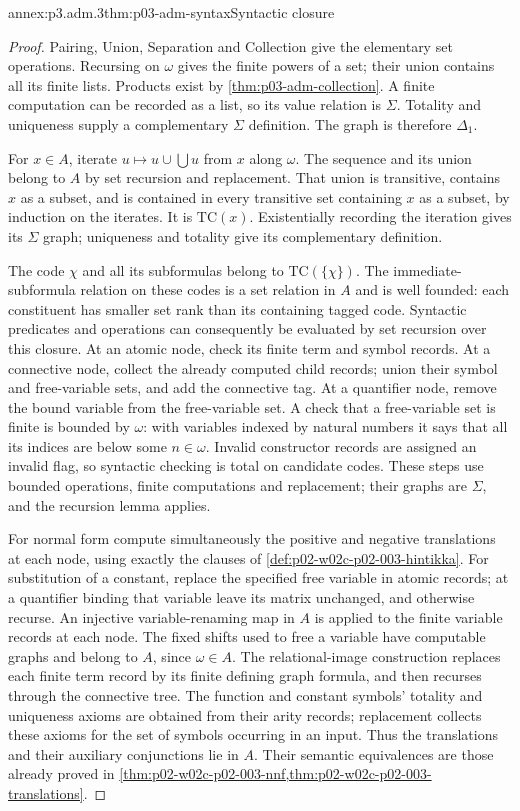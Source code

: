 \begin{annexitem}{annex:p3.adm.3}{thm:p03-adm-syntax}{Syntactic closure}
\begin{proof}
Pairing, Union, Separation and Collection give the elementary set
operations. Recursing on \(\omega\) gives the finite powers of a set;
their union contains all its finite lists. Products exist by
\cref{thm:p03-adm-collection}. A finite computation can be recorded
as a list, so its value relation is \(\Sigma\). Totality and uniqueness
supply a complementary \(\Sigma\) definition. The graph is therefore
\(\Delta_1\).

For \(x\in A\), iterate \(u\mapsto u\cup\bigcup u\) from \(x\)
along \(\omega\). The sequence and its union belong to \(A\) by set
recursion and replacement. That union is transitive, contains \(x\) as
a subset, and is contained in every transitive set containing \(x\)
as a subset, by induction on the iterates. It is \(\mathrm{TC}(x)\).
Existentially recording the iteration gives its \(\Sigma\) graph;
uniqueness and totality give its complementary definition.

The code \(\chi\) and all its subformulas belong to
\(\mathrm{TC}(\{\chi\})\). The immediate-subformula relation
on these codes is a set relation in \(A\) and is well founded: each constituent has smaller
set rank than its containing tagged code. Syntactic predicates and
operations can consequently be evaluated by set recursion over this
closure. At an atomic node, check its finite term and symbol records.
At a connective node, collect the already computed child records;
union their symbol and free-variable sets, and add the connective tag.
At a quantifier node, remove the bound variable from the free-variable
set. A check that a free-variable set is finite is bounded by \(\omega\):
with variables indexed by natural numbers it says that all its indices
are below some \(n\in\omega\). Invalid constructor records are assigned
an invalid flag, so syntactic checking is total on candidate codes.
These steps use bounded operations, finite computations and replacement;
their graphs are \(\Sigma\), and the recursion lemma applies.

For normal form compute simultaneously the positive and negative
translations at each node, using exactly the clauses of
\cref{def:p02-w02c-p02-003-hintikka}. For substitution of a constant,
replace the specified free variable in atomic records; at a quantifier
binding that variable leave its matrix unchanged, and otherwise recurse.
An injective variable-renaming map in \(A\) is applied to the finite
variable records at each node. The fixed shifts used to free a variable
have computable graphs and belong to \(A\), since \(\omega\in A\).
The relational-image construction replaces each finite term record by
its finite defining graph formula, and then recurses through the
connective tree. The function and constant symbols' totality and
uniqueness axioms are obtained from their arity records; replacement
collects these axioms for the set of symbols occurring in an input.
Thus the translations and their auxiliary conjunctions lie in \(A\).
Their semantic equivalences are those already proved in
\cref{thm:p02-w02c-p02-003-nnf,thm:p02-w02c-p02-003-translations}.


\end{proof}
\end{annexitem}
